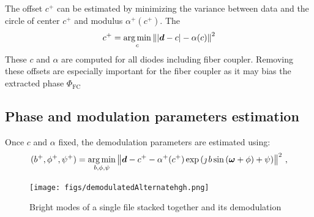 \documentclass[a4paper,11pt,twoside]{scrartcl}
\begin{document}
The offset $c^+$ can be estimated by minimizing the variance between data and the circle of center $c^+$ and modulus $\alpha^+(c^+)$. The 
\begin{equation}
    c^+ = \argmin_c \Norm{\abs{\V{d} - c} - \alpha(c)}^2
\end{equation}
These $c$ and $\alpha$ are computed for all diodes including fiber coupler.  Removing these offsets are especially important for the fiber coupler as it may bias the extracted phase $\Phi_\textrm{FC}$

\subsection{Phase and modulation parameters  estimation}
Once $c$ and $\alpha$ fixed, the demodulation parameters are estimated using:
\begin{equation}
    (b^+, \phi^+, \psi^+) = \argmin_{b,\phi,\psi} \Norm{\V{d} -  c^+ - \alpha^+(c^+) \exp\left( \jmath \, b \sin\left( \V{\omega} + \phi\right) + \psi \right) }^2\,,
\end{equation}

\begin{figure}
    \centering
    \texttt{[image: figs/demodulatedAlternatehgh.png]}
    \caption{Bright modes of a single file stacked together and its demodulation}
    \label{fig:demodulatedAlternatehgh}
\end{figure}
\end{document}
